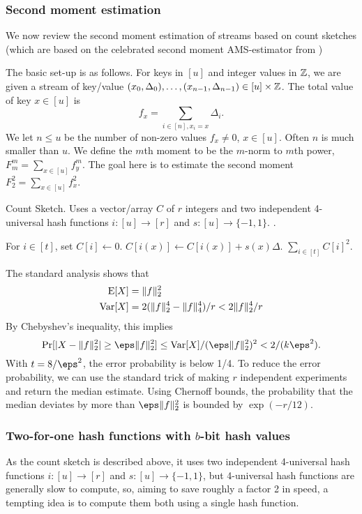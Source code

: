 \subsubsection{Second moment estimation}
We now review the second moment estimation of streams based on count
sketches \cite{charikar04count-sketch} (which are based on the
celebrated second moment AMS-estimator from \cite{alon96frequency})

The basic set-up is as follows.  For keys in $[u]$ and integer values in $\mathbb Z$, we are given a stream of key/value $(x_0,\Delta_0),\ldots, (x_{n-1},\Delta_{n-1})\in [u]\times\mathbb Z$. The
total value of key $x\in[u]$ is
\[f_x=\sum_{i\in[n],x_i=x} \Delta_i.\]
We let $n\leq u$ be  the number of non-zero values
$f_x\neq 0$, $x\in [u]$. Often $n$ is much smaller than $u$.
We define the $m$th moment to be the $m$-norm to $m$th power,
$F_m^m = \sum_{x\in [u]}f_y^m$. The goal here is to
estimate the second moment $F_2^2 = \sum_{x\in [u]}f_x^2$. 

\begin{algorithm}[H]
   \caption{\label{alg:count-sketch} Count Sketch. Uses a
      vector/array $C$ of $r$ integers and two independent
      4-universal hash functions $i:[u]\to[r]$ and $s:[u]\to\{-1,1\}$.
   .}
   \begin{algorithmic}
         \State For $i\in[t]$, set $C[i]\gets 0$.
      \EndProcedure
         \State $C[i(x)]\gets C[i(x)]+s(x) \Delta$. 
      \EndProcedure
         \State \Return $\sum_{i\in[t]} C[i]^2$.
      \EndProcedure
   \end{algorithmic}
\end{algorithm}
The standard analysis \cite{charikar04count-sketch} shows that 
\begin{align}
   \operatorname*{E}[X]&= \| f\|_2^2 \label{eq:E-F2}\\
   \operatorname*{Var}[X]&=2(\| f\|_2^4 - \| f\|_4^4)/r<2\| f\|_2^4/r \label{eq:V-F2}
\end{align}
By Chebyshev's inequality, this implies
\[\Pr[|X-\| f\|_2^2|\geq \eps \| f\|_2^2]\leq \Var[X]/(\eps \| f\|_2^2)^2<
2/(k\eps^2).\]
With $t=8/\eps^2$, the error probability is below 1/4.
To reduce the error probability, we can use the standard trick of making $r$ independent experiments and return the median estimate.
Using Chernoff bounds, the probability that the median deviates by more than $\eps \|f\|_2^2$ is bounded by $\exp(-r/12)$.

\subsubsection{Two-for-one hash functions with \texorpdfstring{$b$}{b}-bit hash values}
As the count sketch is described above,
it uses two independent 4-universal hash functions
$i:[u]\to[r]$ and $s:[u]\to\{-1,1\}$, but 4-universal hash functions
are generally slow to compute, so, aiming to save roughly a factor 2
in speed, a tempting idea is to compute them both using a single hash
function.

